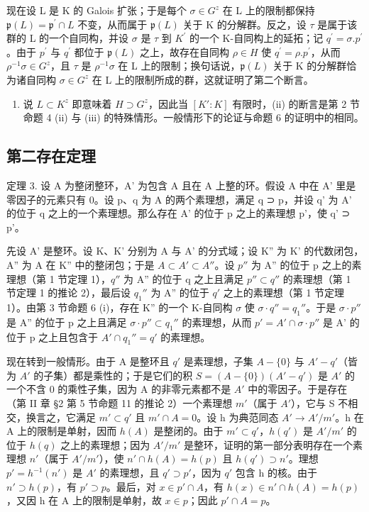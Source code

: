 现在设 L 是 K 的 Galois 扩张；于是每个 \(\sigma\in G^{z}\) 在 L 上的限制都保持 \(\mathfrak{p}(L)=\mathfrak{p}^{\prime}\cap L\) 不变，从而属于 \(\mathfrak{p}(L)\) 关于 K 的分解群。反之，设 \(\tau\) 是属于该群的 L 的一个自同构，并设 \(\sigma\) 是 \(\tau\) 到 \(K^{\prime}\) 的一个 K-自同构上的延拓；记 \(q^{\prime}=\sigma.p^{\prime}\)。由于 \(p^{\prime}\) 与 \(q^{\prime}\) 都位于 \(\mathfrak{p}(L)\) 之上，故存在自同构 \(\rho\in H\) 使 \(q^{\prime}=\rho.p^{\prime}\)，从而 \(\rho^{-1}\sigma\in G^{z}\)，且 \(\tau\) 是 \(\rho^{-1}\sigma\) 在 L 上的限制；换句话说，\(\mathfrak{p}(L)\) 关于 K 的分解群恰为诸自同构 \(\sigma\in G^{z}\) 在 L 上的限制所成的群，这就证明了第二个断言。

\begin{enumerate}
\def\labelenumi{(\roman{enumi})}
\setcounter{enumi}{1}
\tightlist
\item
  说 \(L \subset K^{z}\) 即意味着 \(H \supset G^{z}\)，因此当 \([K':K]\) 有限时，(ii) 的断言是第 2 节命题 4 (ii) 与 (iii) 的特殊情形。一般情形下的论证与命题 6 的证明中的相同。
\end{enumerate}

\subsection{第二存在定理}

定理 3. 设 A 为整闭整环，A' 为包含 A 且在 A 上整的环。假设 A 中在 A' 里是零因子的元素只有 0。设 p、q 为 A 的两个素理想，满足 q ⊃ p，并设 q' 为 A' 的位于 q 之上的一个素理想。那么存在 A' 的位于 p 之上的素理想 p'，使 q' ⊃ p'。

先设 A' 是整环。设 K、K' 分别为 A 与 A' 的分式域；设 K'' 为 K' 的代数闭包，A'' 为 A 在 K'' 中的整闭包；于是 \(A \subset A' \subset A''\)。设 \(p''\) 为 A'' 的位于 p 之上的素理想（第 1 节定理 1），\(q''\) 为 A'' 的位于 q 之上且满足 \(p'' \subset q''\) 的素理想（第 1 节定理 1 的推论 2），最后设 \(q_{1}''\) 为 A'' 的位于 \(q'\) 之上的素理想（第 1 节定理 1）。由第 3 节命题 6 (i)，存在 K'' 的一个 K-自同构 \(\sigma\) 使 \(\sigma \cdot q'' = q_{1}''\)。于是 \(\sigma \cdot p''\) 是 A'' 的位于 p 之上且满足 \(\sigma \cdot p'' \subset q_{1}''\) 的素理想，从而 \(p' = A' \cap \sigma \cdot p''\) 是 A' 的位于 p 之上且包含于 \(A' \cap q_{1}'' = q'\) 的素理想。

现在转到一般情形。由于 A 是整环且 \(q'\) 是素理想，子集 \(A - \{0\}\) 与 \(A' - q'\)（皆为 \(A'\) 的子集）都是乘性的；于是它们的积 \(S = (A - \{0\})(A' - q')\) 是 \(A'\) 的一个不含 0 的乘性子集，因为 A 的非零元素都不是 \(A'\) 中的零因子。于是存在（第 II 章 §2 第 5 节命题 11 的推论 2）一个素理想 \(m'\)（属于 \(A'\)），它与 S 不相交，换言之，它满足 \(m' \subset q'\) 且 \(m' \cap A = 0\)。设 h 为典范同态 \(A' \to A'/m'\)。h 在 A 上的限制是单射，因而 \(h(A)\) 是整闭的。由于 \(m' \subset q'\)，\(h(q')\) 是 \(A'/m'\) 的位于 \(h(q)\) 之上的素理想；因为 \(A'/m'\) 是整环，证明的第一部分表明存在一个素理想 \(n'\)（属于 \(A'/m'\)），使 \(n' \cap h(A) = h(p)\) 且 \(h(q') \supset n'\)。理想 \(p' = h^{-1}(n')\) 是 \(A'\) 的素理想，且 \(q' \supset p'\)，因为 \(q'\) 包含 h 的核。由于 \(n' \supset h(p)\)，有 \(p' \supset p\)。最后，对 \(x \in p' \cap A\)，有 \(h(x) \in n' \cap h(A) = h(p)\)，又因 h 在 A 上的限制是单射，故 \(x \in p\)；因此 \(p' \cap A = p\)。

